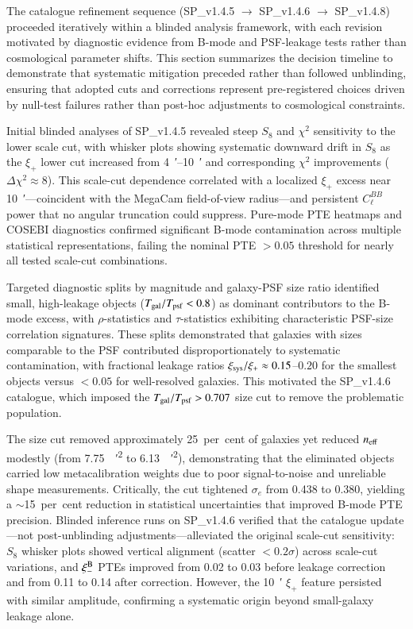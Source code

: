 \documentclass{aa}
\begin{document}
The catalogue refinement sequence (SP\_v1.4.5 $\to$ SP\_v1.4.6 $\to$ SP\_v1.4.8) proceeded iteratively within a blinded analysis framework, with each revision motivated by diagnostic evidence from B-mode and PSF-leakage tests rather than cosmological parameter shifts. This section summarizes the decision timeline to demonstrate that systematic mitigation preceded rather than followed unblinding, ensuring that adopted cuts and corrections represent pre-registered choices driven by null-test failures rather than post-hoc adjustments to cosmological constraints.

Initial blinded analyses of SP\_v1.4.5 revealed steep $S_8$ and $\chi^2$ sensitivity to the lower scale cut, with whisker plots showing systematic downward drift in $S_8$ as the $\xi_+$ lower cut increased from \SIrange{4}{10}{\arcmin} and corresponding $\chi^2$ improvements ($\Delta\chi^2 \approx 8$). This scale-cut dependence correlated with a localized $\xi_+$ excess near \SI{10}{\arcmin}—coincident with the MegaCam field-of-view radius—and persistent $C_\ell^{BB}$ power that no angular truncation could suppress. Pure-mode PTE heatmaps and COSEBI diagnostics confirmed significant B-mode contamination across multiple statistical representations, failing the nominal PTE $> 0.05$ threshold for nearly all tested scale-cut combinations.

Targeted diagnostic splits by magnitude and galaxy-PSF size ratio identified small, high-leakage objects ($T_{\rm gal}/T_{\rm psf} < 0.8$) as dominant contributors to the B-mode excess, with $\rho$-statistics and $\tau$-statistics exhibiting characteristic PSF-size correlation signatures. These splits demonstrated that galaxies with sizes comparable to the PSF contributed disproportionately to systematic contamination, with fractional leakage ratios $\xi_{\rm sys}/\xi_+ \approx 0.15$--$0.20$ for the smallest objects versus $< 0.05$ for well-resolved galaxies. This motivated the SP\_v1.4.6 catalogue, which imposed the $T_{\rm gal}/T_{\rm psf} > 0.707$ size cut to remove the problematic population.

The size cut removed approximately \num{25}~per~cent of galaxies yet reduced $n_{\rm eff}$ modestly (from \SI{7.75}{\per\square\arcmin} to \SI{6.13}{\per\square\arcmin}), demonstrating that the eliminated objects carried low metacalibration weights due to poor signal-to-noise and unreliable shape measurements. Critically, the cut tightened $\sigma_e$ from \num{0.438} to \num{0.380}, yielding a $\sim$\num{15}~per~cent reduction in statistical uncertainties that improved B-mode PTE precision. Blinded inference runs on SP\_v1.4.6 verified that the catalogue update—not post-unblinding adjustments—alleviated the original scale-cut sensitivity: $S_8$ whisker plots showed vertical alignment (scatter $< 0.2\sigma$) across scale-cut variations, and $\xi_-^{\rm B}$ PTEs improved from \num{0.02} to \num{0.03} before leakage correction and from \num{0.11} to \num{0.14} after correction. However, the \SI{10}{\arcmin} $\xi_+$ feature persisted with similar amplitude, confirming a systematic origin beyond small-galaxy leakage alone.
\end{document}
